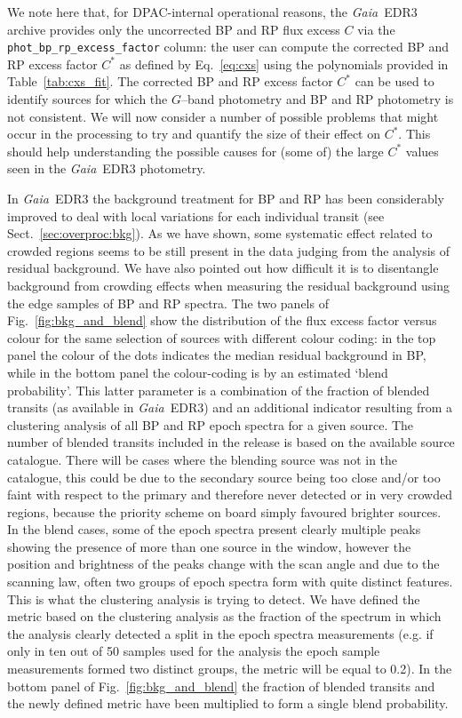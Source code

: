 \documentclass{aa}
\newcommand{\gaia}{\textit{Gaia}\xspace}
\newcommand{\gband}{$G$--band\xspace}
\newcommand{\cxs}{\ensuremath{C^{\ast}}\xspace}
\newcommand{\edr}{\gaia~EDR3\xspace}
\newcommand{\xp}{BP and RP\xspace}
\newcommand{\secname}{Sect.}
\newcommand{\equref}[1]{Eq.~\ref{eq:#1}}
\newcommand{\secref}[1]{\secname~\ref{sec:#1}}
\newcommand{\figref}[1]{Fig.~\ref{fig:#1}}
\newcommand{\tabref}[1]{Table~\ref{tab:#1}}
\begin{document}
We note here that, for DPAC-internal operational reasons, the \edr archive provides only the uncorrected \xp flux excess $C$ via the \texttt{phot\_bp\_rp\_excess\_factor} column: the user can compute the corrected \xp excess factor \cxs as defined by \equref{cxs} using the polynomials provided in \tabref{cxs_fit}.
The corrected \xp excess factor \cxs can be used to identify sources for which the \gband photometry and \xp photometry is not consistent. We will now consider a number of possible problems that might occur in the processing to try and quantify the size of their effect on \cxs. This should help understanding the possible causes for (some of) the large \cxs values seen in the \edr photometry.

In \edr the background treatment for \xp has been considerably improved to deal with local variations for each individual transit (see \secref{overproc:bkg}). As we have shown, some systematic effect related to crowded regions seems to be still present in the data judging from the analysis of residual background. We have also pointed out how difficult it is to disentangle background from crowding effects when measuring the residual background using the edge samples of \xp spectra. The two panels of \figref{bkg_and_blend} show the distribution of the flux excess factor versus colour for the same selection of sources with different colour coding: in the top panel the colour of the dots indicates the median residual background in BP, while in the bottom panel the colour-coding is by an estimated `blend probability'. This latter parameter is a combination of the fraction of blended transits (as available in \edr) and an additional indicator resulting from a clustering analysis of all BP and RP epoch spectra for a given source. The number of blended transits included in the release is based on the available source catalogue. There will be cases where the blending source was not in the catalogue, this could be due to the secondary source being too close and/or too faint with respect to the primary and therefore never detected or in very crowded regions, because the priority scheme on board simply favoured brighter sources. In the blend cases, some of the epoch spectra present clearly multiple peaks showing the presence of more than one source in the window, however the position and brightness of the peaks change with the scan angle and due to the scanning law, often two groups of epoch spectra form with quite distinct features. This is what the clustering analysis is trying to detect. We have defined the metric based on the clustering analysis as the fraction of the spectrum in which the analysis clearly detected a split in the epoch spectra measurements (e.g. if only in ten out of 50 samples used for the analysis the epoch sample measurements formed two distinct groups, the metric will be equal to 0.2). In the bottom panel of \figref{bkg_and_blend} the fraction of blended transits and the newly defined metric have been multiplied to form a single blend probability.
\end{document}
